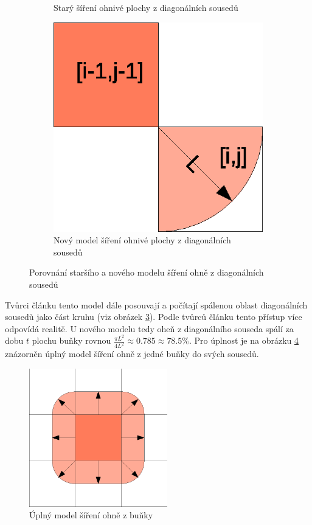 \documentclass[11pt,a4paper]{scrartcl}
\begin{document}
\begin{figure}[H]
\begin{subfigure}{0.3 \textwidth}
			\caption{Starý šíření ohnivé plochy z diagonálních sousedů}
			\label{fig:diag-model-old}
		\end{subfigure}
		\begin{subfigure} {0.3 \textwidth}
			\includegraphics[width=\linewidth]{new-model-diag-spread}
			\caption{Nový model šíření ohnivé plochy z diagonálních sousedů}
			\label{fig:diag-model-new}
		\end{subfigure}
		\caption{Porovnání staršího a nového modelu šíření ohně z diagonálních sousedů}
	\end{figure}

	Tvůrci článku tento model dále posouvají a počítají spálenou oblast diagonálních sousedů jako část kruhu (viz obrázek \ref{fig:diag-model-new}). Podle tvůrců článku tento přístup více odpovídá realitě. U nového modelu tedy oheň z diagonálního souseda spálí za dobu $t$ plochu buňky rovnou $\frac{\pi L^2}{4L^2} \approx 0.785 \approx 78.5\%$. Pro úplnost je na obrázku \ref{fig:full-model} znázorněn úplný model šíření ohně z jedné buňky do svých sousedů.
	
	\begin{figure}[H]
		\centering
		\includegraphics[width=6cm]{model-full-spread}
		\caption{Úplný model šíření ohně z buňky}
		\label{fig:full-model}
	\end{figure}
	
\end{document}
